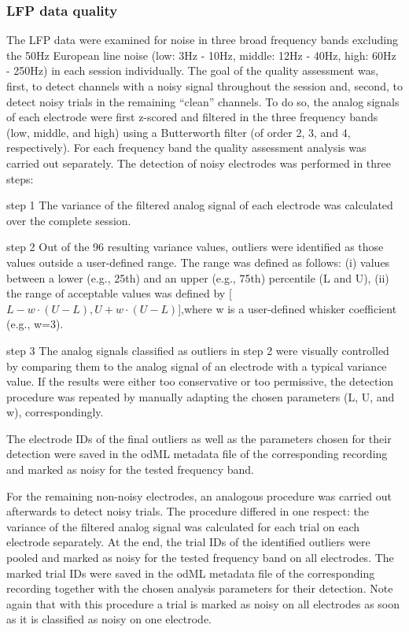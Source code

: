 {\subsubsection{LFP data quality}

The LFP data were examined for noise in three broad frequency bands excluding the 50Hz European line noise (low: 3Hz - 10Hz, middle: 12Hz - 40Hz, high: 60Hz - 250Hz) in each session individually. The goal of the quality assessment was, first, to detect channels with a noisy signal throughout the session and, second, to detect noisy trials in the remaining “clean” channels. To do so, the analog signals of each electrode were first z-scored and filtered in the three frequency bands (low, middle, and high) using a Butterworth filter (of order 2, 3, and 4, respectively). For each frequency band the quality assessment analysis was carried out separately. The detection of noisy electrodes was performed in three steps: 

step 1 The variance of the filtered analog signal of each electrode was calculated over the complete session. 

step 2 Out of the 96 resulting variance values, outliers were identified as those values outside a user-defined range. The range was defined as follows: (i) values between a lower (e.g., 25th) and an upper (e.g., 75th) percentile (L and U), (ii) the range of acceptable values was defined by [$L-w\cdot(U-L),U+w\cdot(U-L)$],where w is a user-defined whisker coefficient (e.g., w=3). 

step 3 The analog signals classified as outliers in step 2 were visually controlled by comparing them to the analog signal of an electrode with a typical variance value. If the results were either too conservative or too permissive, the detection procedure was repeated by manually adapting the chosen parameters (L, U, and w), correspondingly. 

The electrode IDs of the final outliers as well as the parameters chosen for their detection were saved in the odML metadata file of the corresponding recording and marked as noisy for the tested frequency band. 

For the remaining non-noisy electrodes, an analogous procedure was carried out afterwards to detect noisy trials. The procedure differed in one respect: the variance of the filtered analog signal was calculated for each trial on each electrode separately. At the end, the trial IDs of the identified outliers were pooled and marked as noisy for the tested frequency band on all electrodes. The marked trial IDs were saved in the odML metadata file of the corresponding recording together with the chosen analysis parameters for their detection. Note again that with this procedure a trial is marked as noisy on all electrodes as soon as it is classified as noisy on one electrode.

}
